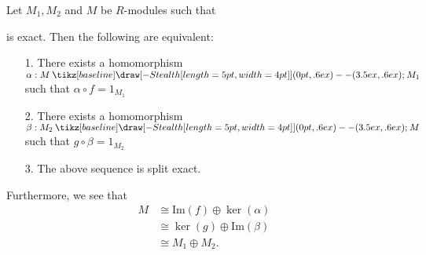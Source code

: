 \documentclass[12pt,letterpaper]{algebra_book}
\newcommand{\smallish}{1.45em} %
\renewcommand{\to}{\mathbin{\tikz[baseline] \draw[-{Stealth[length=5pt,width=4pt]}] (0pt,.6ex) -- (3.5ex,.6ex);}}
\newcommand{\im}{\mbox{Im}}
\theoremstyle{definition}
\begin{document}
\begin{thm}\label{split_exact_lemma}
    Let $M_1, M_2$ and $M$ be $R$-modules such that 
    \begin{center}
    \end{center} 
    is exact. Then the following are equivalent:
    \begin{itemize}
        \item[1.] There exists a homomorphism $\alpha : M \to M_1$
        such that $\alpha \circ f = 1_{M_1}$ 
        \item[2.] There exists a homomorphism $\beta: M_2 \to M$
        such that $g \circ \beta = 1_{M_2}$ 
        \item[3.] The above sequence is split exact. 
    \end{itemize}
    Furthermore, we see that 
    \begin{align*}
        M &\cong \im(f) \oplus \ker(\alpha)\\
        &\cong \ker(g) \oplus \im(\beta)\\
        &\cong M_1 \oplus M_2.
    \end{align*} 
    \vspace{-.5cm}

\end{thm}
\end{document}
